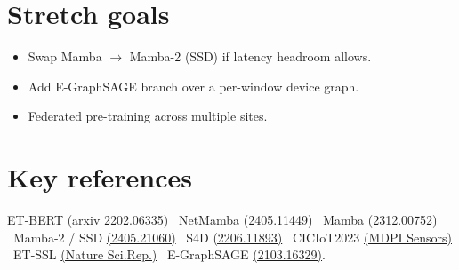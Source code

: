 \documentclass[11pt,a4paper]{article}
\begin{document}
\section{Stretch goals}
\begin{itemize}[leftmargin=*, itemsep=1pt, topsep=2pt]
  \item Swap Mamba $\to$ Mamba-2 (SSD) if latency headroom allows.
  \item Add E-GraphSAGE branch over a per-window device graph.
  \item Federated pre-training across multiple sites.
\end{itemize}

\section{Key references}
\footnotesize
ET-BERT \href{https://arxiv.org/abs/2202.06335}{(arxiv 2202.06335)} \textbullet\
NetMamba \href{https://arxiv.org/abs/2405.11449}{(2405.11449)} \textbullet\
Mamba \href{https://arxiv.org/abs/2312.00752}{(2312.00752)} \textbullet\
Mamba-2 / SSD \href{https://arxiv.org/abs/2405.21060}{(2405.21060)} \textbullet\
S4D \href{https://arxiv.org/abs/2206.11893}{(2206.11893)} \textbullet\
CICIoT2023 \href{https://www.mdpi.com/1424-8220/23/13/5941}{(MDPI Sensors)} \textbullet\
ET-SSL \href{https://www.nature.com/articles/s41598-025-08568-0}{(Nature Sci.Rep.)} \textbullet\
E-GraphSAGE \href{https://arxiv.org/abs/2103.16329}{(2103.16329)}.
\end{document}
